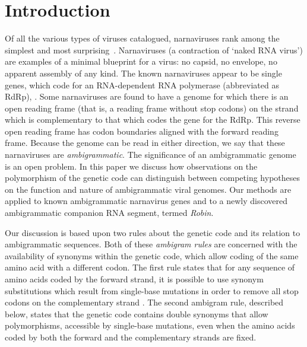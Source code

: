 \documentclass[unnumsec,webpdf,contemporary,large,namedate]{oup-authoring-template}%
\theoremstyle{thmstyleone}%
\theoremstyle{thmstyletwo}%
\theoremstyle{thmstylethree}%
\begin{document}
\maketitle


\section{Introduction}
\label{sec: 1}
Of all the various types of viruses catalogued, narnaviruses rank among the simplest
and most surprising~\citep{Cob+16}.  Narnaviruses (a contraction of \lq naked RNA virus')
are examples of a minimal blueprint for a virus: no capsid, no envelope, no apparent
assembly of any kind. The known narnaviruses appear to be single genes, which code for an
RNA-dependent RNA polymerase
(abbreviated as RdRp), \cite{Hillman2013}. Some narnaviruses 
are found to have a genome for which there is an open reading frame (that is, a reading frame without 
stop codons) on the strand which is complementary to that which codes the gene for the RdRp. 
This reverse open reading frame has codon boundaries aligned with the forward reading 
frame. Because the genome can be read in either direction, we say that these narnaviruses 
are \emph{ambigrammatic}. The significance of an ambigrammatic genome is an open problem. 
In this paper we discuss how observations on the polymorphism of the genetic code can distinguish 
between competing hypotheses on the function and nature of ambigrammatic viral genomes. 
Our methods are applied to known ambigrammatic narnavirus genes and to a newly 
discovered ambigrammatic companion RNA segment, termed \emph{Robin}.

Our discussion is based upon two rules about the genetic code and its relation to ambigrammatic 
sequences. Both of these \emph{ambigram rules} are concerned with the availability of synonyms within 
the genetic code, which allow coding of the same amino acid with a different codon. 
The first rule states that for any sequence of amino acids coded by the forward strand, 
it is possible to use synonym substitutions which result from single-base mutations in order to remove 
all stop codons on the complementary strand \citep[this result was discussed already in][]{DeR+19}. 
The second ambigram rule, described below, states that the genetic code contains double 
synonyms that allow polymorphisms, accessible by single-base mutations, even when the 
amino acids coded by both the forward and the complementary strands are fixed. 
\end{document}
